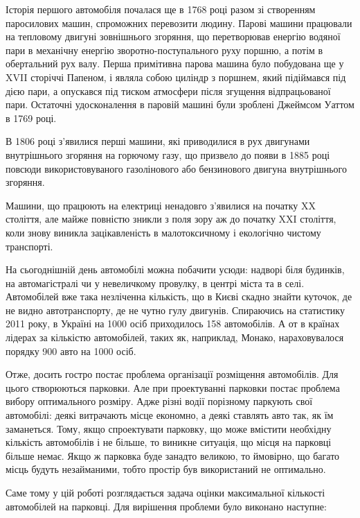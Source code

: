 

Історія першого автомобіля почалася ще в 1768 році разом зі створенням паросилових машин, спроможних перевозити людину. Парові машини працювали на тепловому двигуні зовнішнього згоряння, що перетворював енергію водяної пари в механічну енергію зворотно-поступального руху поршню, а потім в обертальний рух валу. Перша примітивна парова машина було побудована ще у XVII сторіччі Папеном, і являла собою циліндр з поршнем, який підіймався під дією пари, а опускався під тиском атмосфери після згущення відпрацьованої пари. Остаточні удосконалення в паровій машині були зроблені Джеймсом Уаттом в 1769 році.

В 1806 році з’явилися перші машини, які приводилися в рух двигунами внутрішнього згоряння на горючому газу, що призвело до появи в 1885 році повсюди використовуваного газолінового або бензинового двигуна внутрішнього згоряння.

Машини, що працюють на електриці ненадовго з’явилися на початку XX століття, але майже повністю зникли з поля зору аж до початку XXI століття, коли знову виникла зацікавленість в малотоксичному і екологічно чистому транспорті.

На сьогоднішній день автомобілі можна побачити усюди: надворі біля будинків, на автомагістралі чи у невеличкому провулку, в центрі міста та в селі. Автомобілей вже така незліченна кількість, що в Києві скадно знайти куточок, де не видно автотранспорту, де не чутно гулу двигунів.
Спираючись на статистику 2011 року, в Україні на 1000 осіб приходилось 158 автомобілів. А от в країнах лідерах за кількістю автомобілей, таких як, наприклад, Монако, нараховувалося порядку 900 авто на 1000 осіб.

Отже, досить гостро постає проблема організації розміщення автомобілів. Для цього створюються парковки. Але при проектуванні парковки постає проблема вибору оптимального розміру. Адже різні водії порізному паркують свої автомобілі: деякі витрачають місце економно, а деякі ставлять авто так, як їм заманеться. Тому, якщо спроектувати парковку, що може вмістити необхідну кількість автомобілів і не більше, то виникне ситуація, що місця на парковці більше немає. Якщо ж парковка буде занадто великою, то ймовірно, що багато місць будуть незайманими, тобто простір був використаний не оптимально.

Саме тому у цій роботі розглядається задача оцінки максимальної кількості автомобілей на парковці. Для вирішення проблеми було виконано наступне:

